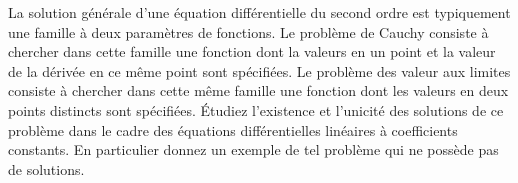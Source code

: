 
\begin{exercice}\label{exoEqsDiff0009}

La solution générale d'une équation différentielle du second ordre 
est typiquement une famille à deux paramètres de fonctions. Le 
problème de \og Cauchy\fg{}  consiste à chercher dans cette famille une 
fonction dont la valeurs en un point et la valeur de la dérivée en ce 
même point sont spécifiées. Le problème des \og valeur aux limites\fg{} 
consiste à chercher dans cette même famille une fonction dont les 
valeurs en deux points distincts sont spécifiées. Étudiez l'existence 
et l'unicité des solutions de ce problème dans le cadre des équations 
différentielles linéaires à coefficients constants. En particulier 
donnez un exemple de tel problème qui ne possède pas de solutions.

\end{exercice}
